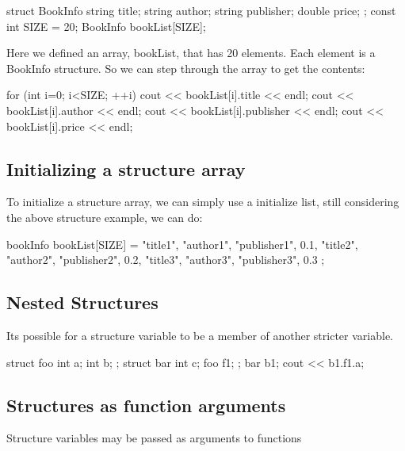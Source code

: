 \documentclass{report}
\begin{document}
	\begin{cppcode}
struct BookInfo {
    string title;
    string author;
    string publisher;
    double price;
};
const int SIZE = 20;
BookInfo bookList[SIZE];
	\end{cppcode}
	
	\bigbreak \noindent 
	Here we defined an array, bookList, that has 20 elements. Each element is a BookInfo structure.
	\bigbreak \noindent 
	So we can step through the array to get the contents:
	\bigbreak \noindent 
	
	\begin{cppcode}
for (int i=0; i<SIZE; ++i) {
        cout << bookList[i].title << endl;
        cout << bookList[i].author << endl;
        cout << bookList[i].publisher << endl;
        cout << bookList[i].price << endl;
    }
	\end{cppcode}
	
	\bigbreak \noindent 
	\subsection{Initializing a structure array}
	\bigbreak \noindent 
	To initialize a structure array, we can simply use a initialize list, still considering the above structure example, we can do:
	\bigbreak \noindent 
	
	\begin{cppcode}
bookInfo bookList[SIZE] = {
                            {"title1", "author1", "publisher1", 0.1},
                            {"title2", "author2", "publisher2", 0.2},
                            {"title3", "author3", "publisher3", 0.3}
                            };
	\end{cppcode}
	
	\bigbreak \noindent 

	\pagebreak
	\subsection{Nested Structures}
	\bigbreak \noindent 
	Its possible for a structure variable to be a member of another stricter variable.
	\bigbreak \noindent 
	
	\begin{cppcode}
struct foo {
    int a;
    int b;
};
struct bar {
    int c;
    foo f1;
};
bar b1;
cout << b1.f1.a;
	\end{cppcode}
	

	\bigbreak \noindent 
	\subsection{Structures as function arguments}
	\bigbreak \noindent 
	\begin{concept}
	   Structure variables may be passed as arguments to functions 
	\end{concept}
	\bigbreak \noindent 
	
\end{document}
